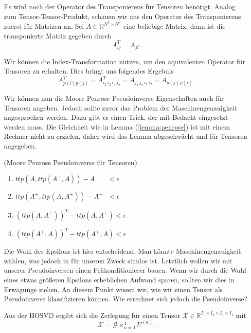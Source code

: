 Es wird noch der Operator des Transponierens für Tensoren benötigt. Analog zum Tensor-Tensor-Produkt, schauen wir uns den Operator des Transponierens zuerst für Matrizen an.
Sei $A \in \mathbb{R}^{N^2 \times N^2}$ eine beliebige Matrix, dann ist die transponierte Matrix gegeben durch
\begin{equation}
A_{ij}^T = A_{ji}.
\end{equation}

Wir können die Index-Transformation nutzen, um den äquivalenten Operator für Tensoren zu erhalten. Dies bringt uns folgendes Ergebnis
\begin{equation}
A_{p(i)p(j)}^T=A_{i_1 \, i_2 \, i_1 \, j_2}^T=A_{ j_1 \, j_2 \, i_1 \, i_2}=A_{p(j) \,p(i)}.
\end{equation}

Wir können nun die Moore Penrose Pseudoinverse Eigenschaften auch für Tensoren angeben. Jedoch sollte zuvor das Problem der Maschinengenauigkeit angesprochen werden. Dazu gibt es einen Trick, der mit Bedacht eingesetzt werden muss. Die Gleichheit wie in Lemma (\ref{lemma:penrose}) ist mit einem Rechner nicht zu erzielen, daher wird das Lemma abgeschwächt und für Tensoren angegeben. 
\begin{Lemma} (Moore Penrose Pseudoinverse für Tensoren) \label{lemma:tpinv}
\begin{enumerate}
\item $ttp(A,ttp(A^{+},A))-A \, \, \, \, \, \, \, \, \, \, \, < \epsilon$
\item $ttp(A^{+},ttp(A,A^{+}))-A^{+} \, \,  \, \, < \epsilon $ 
\item $(ttp(A,A^{+}))^{T}-ttp(A,A^{+}) < \epsilon $ 
\item $(ttp(A^{+},A))^{T}-ttp(A^{+},A) < \epsilon $ 
\end{enumerate}
\end{Lemma}

Die Wahl des Epsilons ist hier entscheidend. Man könnte Maschinengenauigkeit wählen, was jedoch in für unseren Zweck sinnlos ist. Letztlich wollen wir mit unserer Pseudoinversen einen Präkonditionierer bauen. Wenn wir durch die Wahl eines etwas größeren Epsilons erheblichen Aufwand sparen, sollten wir dies in Erwägunge ziehen.
An diesem Punkt wissen wir, wie wir einen Tensor als Pseudoinverse klassifizieren können. Wie errechnet sich jedoch die Pseudoinverse?

Aus der HOSVD ergibt sich die Zerlegung für einen Tensor $\pmb{\mathscr{X}}  \in \mathbb{R}^{I_1 \times I_2 \times I_3 \times I_4}$  mit
\begin{equation}
\pmb{\mathscr{X}} = \pmb{\mathscr{G}} \times_{n=1}^{4} U^{ (n) }.
\end{equation}

